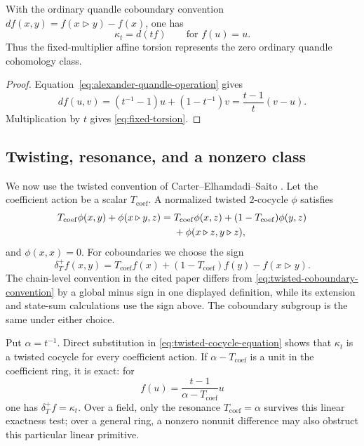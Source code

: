 \begin{proposition}
\label{prop:ordinary-affine-exactness}
With the ordinary quandle coboundary convention
$df(x,y)=f(x\triangleright y)-f(x)$, one has
\[
 \kappa_t=d(tf)
 \qquad\text{for }f(u)=u.
\]
Thus the fixed-multiplier affine torsion represents the zero ordinary quandle
cohomology class.
\end{proposition}

\begin{proof}
Equation~\eqref{eq:alexander-quandle-operation} gives
\[
 df(u,v)=(t^{-1}-1)u+(1-t^{-1})v
 =\frac{t-1}{t}(v-u).
\]
Multiplication by $t$ gives \eqref{eq:fixed-torsion}.
\end{proof}

\subsection{Twisting, resonance, and a nonzero class}

We now use the twisted convention of Carter--Elhamdadi--Saito
\cite{CarterElhamdadiSaito2002TwistedQuandle}.  Let the coefficient action be a
scalar $T_{\mathrm{coef}}$.  A normalized twisted $2$-cocycle $\phi$ satisfies
\begin{align}
 T_{\mathrm{coef}}\phi(x,y)+\phi(x\triangleright y,z)
 ={}&T_{\mathrm{coef}}\phi(x,z)
 +(1-T_{\mathrm{coef}})\phi(y,z)\notag\\
 &+\phi(x\triangleright z,y\triangleright z),
 \label{eq:twisted-cocycle-equation}
\end{align}
and $\phi(x,x)=0$.  For coboundaries we choose the sign
\begin{equation}
 \delta_T^+f(x,y)=T_{\mathrm{coef}}f(x)
 +(1-T_{\mathrm{coef}})f(y)-f(x\triangleright y).
 \label{eq:twisted-coboundary-convention}
\end{equation}
The chain-level convention in the cited paper differs from
\eqref{eq:twisted-coboundary-convention} by a global minus sign in one displayed
definition, while its extension and state-sum calculations use the sign above.
The coboundary subgroup is the same under either choice.

Put $\alpha=t^{-1}$.  Direct substitution in
\eqref{eq:twisted-cocycle-equation} shows that $\kappa_t$ is a twisted cocycle for
every coefficient action.  If $\alpha-T_{\mathrm{coef}}$ is a unit in the
coefficient ring, it is exact: for
\[
 f(u)=\frac{t-1}{\alpha-T_{\mathrm{coef}}}u
\]
one has $\delta_T^+f=\kappa_t$.  Over a field, only the resonance
$T_{\mathrm{coef}}=\alpha$ survives this linear exactness test; over a general ring,
a nonzero nonunit difference may also obstruct this particular linear primitive.

